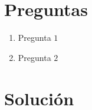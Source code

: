 \documentclass[spanish, fleqn]{article}
\title{INF-155: Introducción a la Informática Teórica\\
       ILI-225: Informática Teórica \\[0.4\baselineskip]
       Tarea \#\num \\
       \emph{``Este es el título de la tarea''}
      }
\author{\href{mailto:daniel.quinteros.12@sansano.usm.cl}{Daniel Quinteros}\\
20122012-2}
\date{6 de Abril 2017}
\begin{document}
\maketitle

\thispagestyle{empty}

\section*{Preguntas}

\begin{enumerate}

    \item Pregunta \(1\)
    \item Pregunta $2$
 
\end{enumerate}

\section*{Solución}
    
\end{document}
